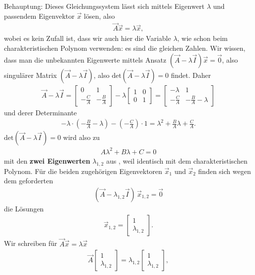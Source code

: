 Behauptung:
Dieses Gleichungssystem lässt sich mittels Eigenwert $\lambda$ und passendem
Eigenvektor $\vec{x}$ lösen, also
\begin{align}
\vec{A} \vec{x} = \lambda \vec{x},
\end{align}
wobei es kein Zufall ist, dass wir auch hier die Variable $\lambda$, wie schon
beim charakteristischen Polynom verwenden: es sind die gleichen Zahlen.
Wir wissen, dass man die unbekannten Eigenwerte mittels Ansatz
$(\vec{A} - \lambda \vec{I})\vec{x} = \vec{0}$, also singulärer Matrix
$(\vec{A} - \lambda \vec{I})$, also $\mathrm{det}(\vec{A} - \lambda \vec{I})=0$
findet.
%
Daher
\begin{align}
\vec{A} - \lambda \vec{I} =
\begin{bmatrix}
0 & 1 \\ -\frac{C}{A} & -\frac{B}{A}
\end{bmatrix}
-\lambda
\begin{bmatrix}
1 & 0 \\ 0 & 1
\end{bmatrix}
=
\begin{bmatrix}
-\lambda & 1 \\ -\frac{C}{A} & -\frac{B}{A} - \lambda
\end{bmatrix}
\end{align}
und derer Determinante
\begin{align}
-\lambda \cdot (-\frac{B}{A} - \lambda) - (-\frac{C}{A})\cdot 1 = \lambda^2 + \frac{B}{A} \lambda + \frac{C}{A}.
\end{align}
%
$\mathrm{det}(\vec{A} - \lambda \vec{I})=0$ wird also zu
\begin{align}
A \lambda^2 + B \lambda + C = 0
\end{align}
mit den \textbf{zwei Eigenwerten} $\lambda_{1,2}$ aus ,
weil identisch mit dem charakteristischen Polynom.
%
Für die beiden zugehörigen Eigenvektoren $\vec{x}_{1}$ und $\vec{x}_{2}$ finden sich wegen
dem geforderten
\begin{align}
(\vec{A} - \lambda_{1,2} \vec{I}) \, \vec{x}_{1,2} = \vec{0}
\end{align}
die Lösungen
\begin{align}
\vec{x}_{1,2} =
\begin{bmatrix}
1 \\ \lambda_{1,2}
\end{bmatrix}.
\end{align}
%
Wir schreiben für $\vec{A} \vec{x} = \lambda \vec{x}$
%
\begin{align}
\vec{A}
\begin{bmatrix}
1 \\ \lambda_{1,2}
\end{bmatrix} = \lambda_{1,2}
\begin{bmatrix}
1 \\ \lambda_{1,2}
\end{bmatrix},
\end{align}
